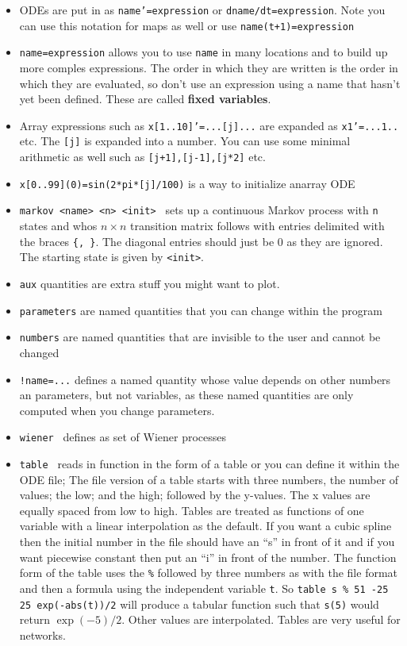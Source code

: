 \begin{itemize}\itemsep -.05in
\item ODEs are put in as {\tt name'=expression} or {\tt dname/dt=expression}. Note you can use this notation for maps as well or use {\tt name(t+1)=expression}
\item {\tt name=expression} allows you to use {\tt name} in many locations and to build up more comples expressions. The order in which they are written is the order in which they are evaluated, so don't use an expression using a name that hasn't yet been defined. These are called {\bf fixed variables}.
\item Array expressions such as {\tt x[1..10]'=...[j]...} are expanded as {\tt x1'=...1..} etc. The {\tt [j]} is expanded into a number. You can use some minimal arithmetic as well such as {\tt [j+1],[j-1],[j*2]} etc. 
\item {\tt x[0..99](0)=sin(2*pi*[j]/100)} is a way to initialize anarray ODE    
\item {\tt markov <name> <n> <init> } sets up a continuous Markov process with {\tt n} states and whos $n\times n$ transition matrix follows with entries delimited with the braces {\tt \{, \}}. The diagonal entries should just be 0 as they are ignored. The starting state is given by {\tt <init>}.  
\item {\tt aux} quantities are extra stuff you might want to plot.
\item {\tt parameters} are named quantities that you can change within the program
\item {\tt numbers} are named quantities that are invisible to the user and cannot be changed
\item {\tt !name=...} defines a named quantity whose value depends on other numbers an parameters, but not variables, as these named quantities are only computed when you change parameters.       
\item {\tt wiener } defines as set of Wiener processes 
\item {\tt table } reads in function in the form of a table or you can define it within the ODE file; The file version of a table starts with three numbers, the number of values; the low; and the high; followed by the y-values.  The x values are equally spaced from low to high. Tables are treated as functions of one variable with a linear interpolation as the default. If you want a cubic spline then the initial number in the file should have an ``s'' in front of it and if you want piecewise constant then put an ``i'' in front of the number.  The function form of the table uses the {\tt \%} followed by three numbers as with the file format and then a formula using the independent variable {\tt t}. So {\tt table s \% 51 -25 25 exp(-abs(t))/2} will produce a tabular function such that {\tt s(5)} would return $\exp(-5)/2.$  Other values are interpolated. Tables are very useful for networks. 

\end{itemize}
